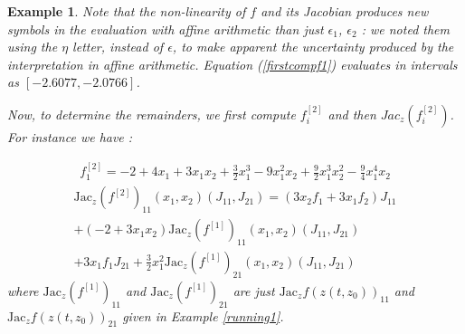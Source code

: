 \documentclass{sig-alternate-05-2015}
\newtheorem{example}{Example}
\def\intvl#1{\mbox{$[ #1 ]$}}
\begin{document}
\begin{example}
Note that the non-linearity of $f$ and its Jacobian produces new symbols in the evaluation with affine arithmetic than just $\epsilon_1$,
$\epsilon_2$ : we noted them using the $\eta$ letter, instead of $\epsilon$, to make apparent the uncertainty
produced by the interpretation in affine arithmetic. 
Equation (\ref{firstcompf1}) evaluates in intervals
as $\left[-2.6077,-2.0766\right]$.

Now, to determine the remainders, we first compute
$f_i^{[2]}$ and then 
$Jac_z(f_i^{[2]})$. For instance we have : 

\begin{multline}
{f}_1^{[2]} = -2+4x_1+3x_1x_2+\frac{3}{2}x_1^3-9x_1^2x_2
+\frac{9}{2}x_1^3x_2^2-\frac{9}{4}x_1^4x_2
\end{multline}
\begin{multline}
\mbox{Jac}_z(f^{[2]})_{11}(x_1,x_2)(J_{11},J_{21}) = (3x_2f_1+3x_1f_2)J_{11}\\
+(-2+3x_1x_2)\mbox{Jac}_z(f^{[1]})_{11}(x_1,x_2)(J_{11},J_{21}) \\ 
+3x_1f_1J_{21}+\frac{3}{2}x_1^2{\mbox{Jac}_z(f^{[1]})}_{21}(x_1,x_2)(J_{11},J_{21}) 
\label{secondderivative}
\end{multline} %
\noindent where $\mbox{Jac}_z(f^{[1]})_{11}$ %
and ${\mbox{Jac}_z(f^{[1]})}_{21}$ %
are just $\mbox{Jac}_z f(z(t,z_0))_{11}$ and $\mbox{Jac}_z f(z(t,z_0))_{21}$ given in Example \ref{running1}.


\end{example}
\end{document}
